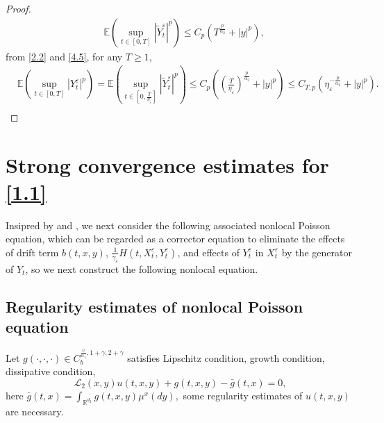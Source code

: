 \documentclass[11pt,reqno]{amsart}
\numberwithin{equation}{section}
\begin{document}
\begin{proof}
\begin{equation}
\begin{split}
		& \mathbb{E}\left(\sup_{t\in [0,T]} |\tilde{Y}_{t}^{\varepsilon}|^{p}\right)\leq C_{p}\left( T^{\frac{p}{\alpha_{2}}}+|y|^{p}\right),
	\end{split}\nonumber
\end{equation}
from \eqref{2.2} and \eqref{4.5}, for any $T\geq 1$,
	\begin{equation}\label{4.12}
		\begin{split}
			&\mathbb{E}\left(\sup_{t\in [0,T]} |Y_{t}^{\varepsilon}|^{p}\right)= \mathbb{E}\left(\sup_{t\in [0,\frac{T}{\eta_{\varepsilon}}]} |\tilde{Y}_{t}^{\varepsilon}|^{p}\right)\leq C_{p}\left( \left( \frac{T}{\eta_{\varepsilon}}\right) ^{\frac{p}{\alpha_{2}}}+|y|^{p}\right) \leq C_{T,p}\left( \eta_{\varepsilon}^{-\frac{p}{\alpha_{2}}}+|y|^{p}\right).\\
		\end{split}
	\end{equation}
\end{proof}





\section{Strong convergence estimates for \ref{1.1}}

 Insipred by \cite{RX} and \cite{SXX}, we next consider the following associated nonlocal Poisson equation, which can be regarded as a corrector equation to eliminate the effects of drift term $b(t,x,y)$, $\frac{1}{\gamma_{\varepsilon}}H(t,X_{t}^{\varepsilon},Y_{t}^{\varepsilon})$, and effects of $Y^{\varepsilon}_{t}$
in $X^{\varepsilon}_{t}$ by the generator of $Y_{t}$, so we next construct the following nonlocal equation.

\subsection{Regularity estimates of nonlocal Poisson equation}

Let $g(\cdot,\cdot,\cdot)\in C_{b}^{\frac{v}{\alpha_{1}},1+\gamma, 2+\gamma}$  satisfies Lipschitz condition, growth condition, dissipative condition,
\begin{equation}\label{5.1}
	\mathcal{L}_{2}(x,y)u(t,x,y)+g(t,x,y)-\bar{g}(t,x)=0,
\end{equation}
 here $ \bar{g}(t,x)=\int_{\mathbb{R}^{d_{2}}}g(t,x,y)\mu^{x}(dy),$ some regularity estimates of $u(t,x,y)$ are necessary.
\end{document}

